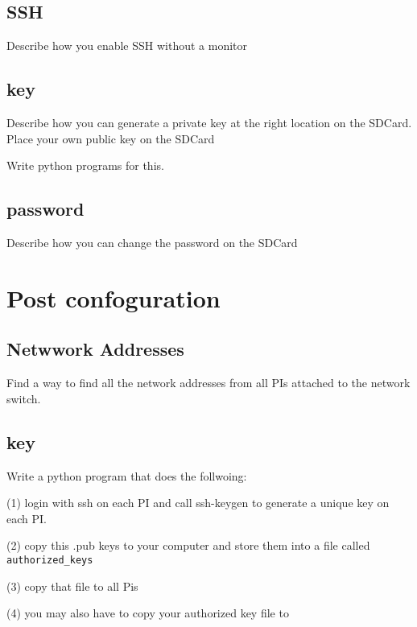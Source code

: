 \subsection{SSH}

\begin{exercise}
Describe how you enable SSH without a monitor
\end{exercise}

\subsection{key}

\begin{exercise}
Describe how you can generate a private key at the right location on
the SDCard. Place your own public key on the SDCard

Write python programs for this.
\end{exercise}


\subsection{password}

\begin{exercise}
Describe how you can change the password on the SDCard
\end{exercise}


\section{Post confoguration}

\subsection{Netwwork Addresses}

\begin{exercise}
Find a way to find all the network addresses from all PIs attached to
the network switch.
\end{exercise}


\subsection{key}


\begin{exercise}

Write a python program that does the follwoing:

(1) login with ssh on each PI and call ssh-keygen to generate a unique
key on each PI.

(2) copy this .pub keys to your computer and store them into a file
called \verb|authorized_keys|

(3) copy that file to all Pis

(4) you may also have to copy your authorized key file to 

\end{exercise}

